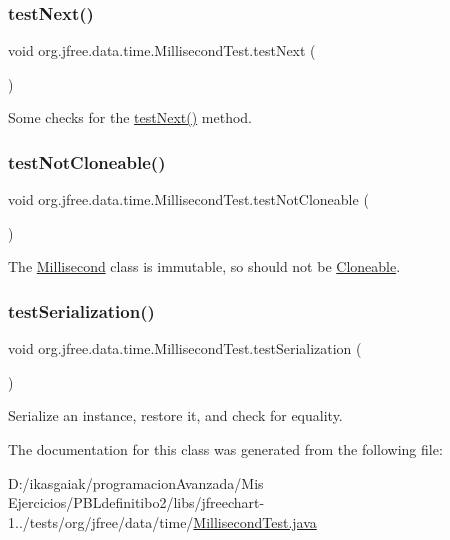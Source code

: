 \subsubsection{\texorpdfstring{test\+Next()}{testNext()}}
{\footnotesize\ttfamily void org.\+jfree.\+data.\+time.\+Millisecond\+Test.\+test\+Next (\begin{DoxyParamCaption}{ }\end{DoxyParamCaption})}

Some checks for the \mbox{\hyperlink{classorg_1_1jfree_1_1data_1_1time_1_1_millisecond_test_ae2553577faa2fb2ee9c6ace7276edf04}{test\+Next()}} method. \mbox{\label{classorg_1_1jfree_1_1data_1_1time_1_1_millisecond_test_a6a323c3fc6fce0b8e84d37a33de78d3c}} 
\subsubsection{\texorpdfstring{test\+Not\+Cloneable()}{testNotCloneable()}}
{\footnotesize\ttfamily void org.\+jfree.\+data.\+time.\+Millisecond\+Test.\+test\+Not\+Cloneable (\begin{DoxyParamCaption}{ }\end{DoxyParamCaption})}

The \mbox{\hyperlink{classorg_1_1jfree_1_1data_1_1time_1_1_millisecond}{Millisecond}} class is immutable, so should not be \mbox{\hyperlink{}{Cloneable}}. \mbox{\label{classorg_1_1jfree_1_1data_1_1time_1_1_millisecond_test_ac260bba0fa2fb5bbe687b30ee4f79dc8}} 
\subsubsection{\texorpdfstring{test\+Serialization()}{testSerialization()}}
{\footnotesize\ttfamily void org.\+jfree.\+data.\+time.\+Millisecond\+Test.\+test\+Serialization (\begin{DoxyParamCaption}{ }\end{DoxyParamCaption})}

Serialize an instance, restore it, and check for equality. 

The documentation for this class was generated from the following file\+:\begin{DoxyCompactItemize}
\item 
D\+:/ikasgaiak/programacion\+Avanzada/\+Mis Ejercicios/\+P\+B\+Ldefinitibo2/libs/jfreechart-\/1../tests/org/jfree/data/time/\mbox{\hyperlink{_millisecond_test_8java}{Millisecond\+Test.\+java}}\end{DoxyCompactItemize}
